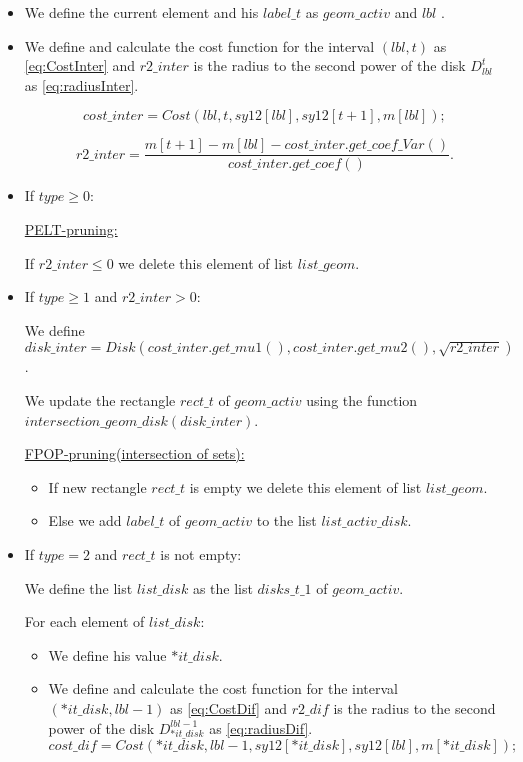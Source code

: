 \documentclass{report}
\begin{document}
\begin{itemize}
	\begin{itemize}
		\item We define the current element and his $label\_t$ as $geom\_activ$ and $lbl$ .
		\item We define and calculate the cost function for the interval $(lbl,t)$ as \ref{eq:CostInter} and $r2\_inter$ is the radius to the second power of the disk $D_{lbl}^t$ as \ref{eq:radiusInter}.
		
		\begin{equation}
		cost\_inter = Cost(lbl, t, sy12[lbl],sy12[t+1], m[lbl]);
			\label{eq:CostInter}
		\end{equation}
		
		\begin{equation}
			r2\_inter = \frac {m[t + 1] - m[lbl] - cost\_inter.get\_coef\_Var()}{   cost\_inter.get\_coef()}.
			\label{eq:radiusInter}
		\end{equation}
		\item If $type \ge 0$:
		
		\underline {PELT-pruning:}
		
		 If $r2\_inter \le 0$ we delete this element of list $list\_geom$.
		\
		\item If $type \ge 1$ and  $r2\_inter > 0$:
		
		We define $disk\_inter = Disk(cost\_inter.get\_mu1(), cost\_inter.get\_mu2(), \sqrt{r2\_inter})$.
		
		We update the rectangle $rect\_t$ of $geom\_activ$ using the function $intersection\_geom\_disk(disk\_inter)$.
		
		\underline {FPOP-pruning(intersection of sets):} 
	 	\begin{itemize}
		 	\item If new rectangle $rect\_t$ is empty we delete this element of list $list\_geom$. 	
		 	\item Else we add  $label\_t$ of $geom\_activ$ to the list $list\_activ\_disk$.
		\end{itemize}
		\item If $type = 2$ and $rect\_t$ is not empty:
			
		We define the list $list\_disk$ as the list $disks\_t\_1$ of $geom\_activ$.
				
		For each element of  $list\_disk$:
		\begin{itemize} 
			\item We define his value $*it\_disk$.
			\item We define and calculate the cost function for the interval $(*it\_disk, lbl-1)$ as \ref{eq:CostDif} and $r2\_dif$ is the radius to the second power of the disk $D^{lbl-1}_{*it\_disk}$ as \ref{eq:radiusDif}.	
			\begin{equation}
					cost\_dif = Cost(*it\_disk, lbl-1, sy12[*it\_disk],sy12[lbl], m[*it\_disk]);
					\label{eq:CostDif}
			\end{equation}
			

\end{itemize}
\end{itemize}
\end{itemize}
\end{document}
